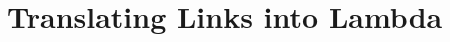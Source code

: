 \documentclass[12pt,mscres,cdtppar,twoside,openright,logo,rightchapter,normalheadings]{infthesis}
\theoremstyle{definition}
\begin{document}

\section{Translating Links into Lambda}
\label{sec:translation}

\newcommand{\trans}[1]{\llbracket #1 \rrbracket}
\newcommand{\mtrans}[1]{\trans{#1}_\mathcal{M}}
\newcommand{\vtrans}[1]{\trans{#1}_\mathcal{V}}
\newcommand{\htrans}[1]{\trans{#1}_\mathcal{H}}
\newcommand{\hptrans}[1]{\trans{#1}_{\mathcal{H}^{op}}}
\end{document}

